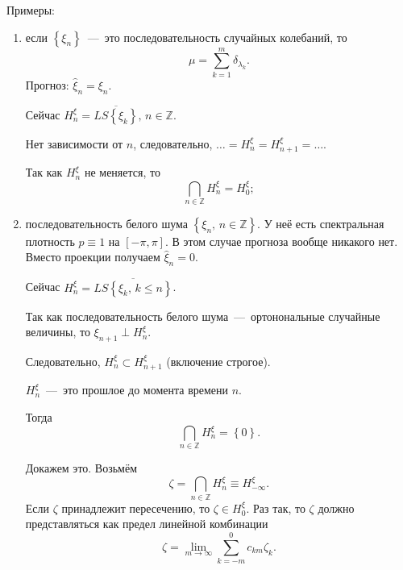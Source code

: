 Примеры:
\begin{enumerate}
  \item если $ \left\{ \xi_n \right\} $~---~это последовательность случайных колебаний, то
  \begin{equation*}
    \mu =
    \sum \limits_{k = 1}^m \delta_{ \lambda_k}.
  \end{equation*}
  Прогноз: $ \hat{ \xi }_n = \xi_n$.

  Сейчас $H_n^{ \xi } = \overline{LS \left\{ \xi_k \right\} }, \, n \in \mathbb{Z}$.

  Нет зависимости от $n$, следовательно, $ \dotsc = H_n^{ \xi } = H_{n + 1}^{ \xi } = \dotsc $.

  Так как $H_n^{ \xi }$ не меняется, то
  \begin{equation*}
    \bigcap \limits_{n \in \mathbb{Z}} H_n^{ \xi } =
    H_0^{ \xi };
  \end{equation*}
  \item последовательность белого шума $ \left\{ \xi_n, \, n \in \mathbb{Z} \right\} $.
  У неё есть спектральная плотность $p \equiv 1$ на $ \left[ -\pi, \pi \right] $.
  В этом случае прогноза вообще никакого нет.
  Вместо проекции получаем $ \hat{ \xi }_n = 0$.

  Сейчас $H_n^{ \xi } = \overline{LS \left\{ \xi_k, \, k \leq n \right\} }$.

  Так как последовательность белого шума~---~ортонональные случайные величины,
  то $ \xi_{n + 1} \perp H_n^{ \xi }$.

  Следовательно, $H_n^{ \xi } \subset H_{n + 1}^{ \xi }$ (включение строгое).

  $H_n^{ \xi }$~---~это прошлое до момента времени $n$.

  Тогда
  \begin{equation*}
    \bigcap \limits_{n \in \mathbb{Z}} H_n^{ \xi } =
    \left\{ 0 \right\}.
  \end{equation*}

  Докажем это.
  Возьмём
  \begin{equation*}
    \zeta =
    \bigcap \limits_{n \in \mathbb{Z}} H_n^{ \xi } \equiv
    H_{-\infty }^{ \xi }.
  \end{equation*}
  Если $ \zeta $ принадлежит пересечению, то $ \zeta \in H_0^{ \xi }$.
  Раз так, то $ \zeta $ должно представляться как предел линейной комбинации
  \begin{equation*}
    \zeta =
    \lim \limits_{m \to \infty } \sum \limits_{k = -m}^0 c_{km} \zeta_k.
  \end{equation*}


\end{enumerate}
